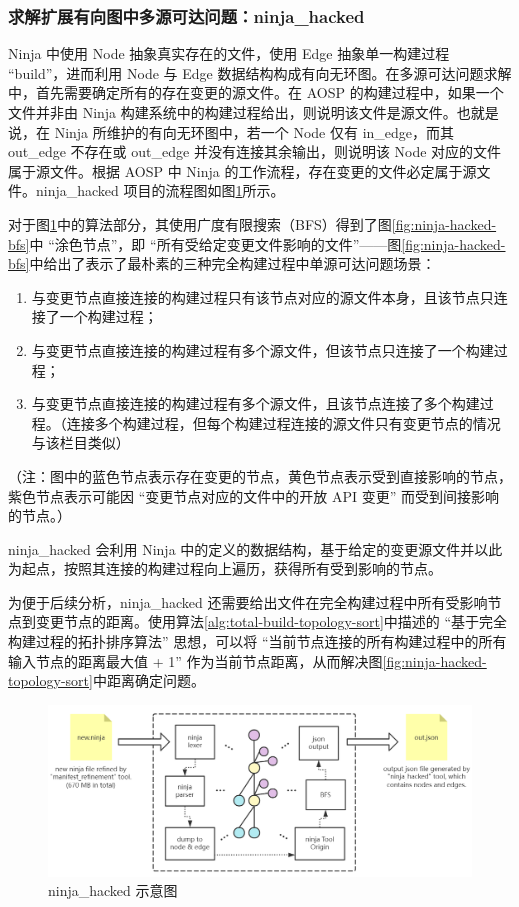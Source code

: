 \subsubsection{求解扩展有向图中多源可达问题：ninja\_hacked}

Ninja 中使用 Node 抽象真实存在的文件，使用 Edge 抽象单一构建过程 “build”，进而利用 Node 与 Edge 数据结构构成有向无环图。在多源可达问题求解中，首先需要确定所有的存在变更的源文件。在 AOSP 的构建过程中，如果一个文件并非由 Ninja 构建系统中的构建过程给出，则说明该文件是源文件。也就是说，在 Ninja 所维护的有向无环图中，若一个 Node 仅有 in\_edge，而其 out\_edge 不存在或 out\_edge 并没有连接其余输出，则说明该 Node 对应的文件属于源文件。根据 AOSP 中 Ninja 的工作流程，存在变更的文件必定属于源文件。ninja\_hacked 项目的流程图如图\ref{fig:archi-ninja-hacked}所示。

对于图\ref{fig:archi-ninja-hacked}中的算法部分，其使用广度有限搜索（BFS）得到了图\ref{fig:ninja-hacked-bfs}中 “涂色节点”，即 “所有受给定变更文件影响的文件”——图\ref{fig:ninja-hacked-bfs}中给出了表示了最朴素的三种完全构建过程中单源可达问题场景：

\begin{enumerate}
    \item 与变更节点直接连接的构建过程只有该节点对应的源文件本身，且该节点只连接了一个构建过程；
    \item 与变更节点直接连接的构建过程有多个源文件，但该节点只连接了一个构建过程；
    \item 与变更节点直接连接的构建过程有多个源文件，且该节点连接了多个构建过程。（连接多个构建过程，但每个构建过程连接的源文件只有变更节点的情况与该栏目类似）
\end{enumerate}

（注：图中的蓝色节点表示存在变更的节点，黄色节点表示受到直接影响的节点，紫色节点表示可能因 “变更节点对应的文件中的开放 API 变更” 而受到间接影响的节点。）

ninja\_hacked 会利用 Ninja 中的定义的数据结构，基于给定的变更源文件并以此为起点，按照其连接的构建过程向上遍历，获得所有受到影响的节点。

为便于后续分析，ninja\_hacked 还需要给出文件在完全构建过程中所有受影响节点到变更节点的距离。使用算法\ref{alg:total-build-topology-sort}中描述的 “基于完全构建过程的拓扑排序算法” 思想，可以将 “当前节点连接的所有构建过程中的所有输入节点的距离最大值 + 1” 作为当前节点距离，从而解决图\ref{fig:ninja-hacked-topology-sort}中距离确定问题。

\begin{figure}[htb]
    \centering
    \includegraphics[width=.9\textwidth]{figures/archi-ninja-hacked.png}
    \caption{ninja\_hacked 示意图}
    \label{fig:archi-ninja-hacked}
\end{figure}


